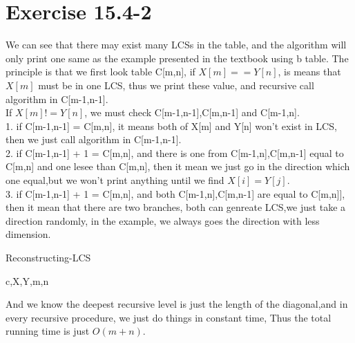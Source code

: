 \documentclass[oneside]{homework} %
\begin{document}
\maketitle
\newpage
\section{Exercise 15.4-2}
We can see that there may exist many LCSs in the table, and the algorithm will only print one same as the example presented in the textbook using b table.
The principle is that we first look table C[m,n], if $X[m] == Y[n]$, is means that $X[m]$ must be in one LCS, thus we print these value, and recursive call algorithm in C[m-1,n-1].\\
If $X[m] != Y[n] $, we must check C[m-1,n-1],C[m,n-1] and C[m-1,n].  \\
1. if C[m-1,n-1] = C[m,n], it means both of X[m] and Y[n] won't exist in LCS, then we just call algorithm in C[m-1,n-1]. 
\\ 2. if C[m-1,n-1] + 1 = C[m,n], and there is one from C[m-1,n],C[m,n-1] equal to C[m,n] and one lesee than C[m,n], then it mean we just go in the direction which one equal,but we won't print anything until we find $X[i] = Y[j]$. 
\\ 3. if C[m-1,n-1] + 1 = C[m,n], and both C[m-1,n],C[m,n-1] are equal to C[m,n]], then it mean that there are two branches, both can genreate LCS,we just take a direction randomly, in the example, we always goes the direction with less dimension. 

  \begin{algorithm}[h]
	\caption{Reconstructing-LCS}
	\label{algo:lcs}
	\begin{algorithmic}[1]
	  \REQUIRE c,X,Y,m,n
	  \ELSE
		  \ELSE
		  \ENDIF
		\ELSE
			\ELSE
			\ENDIF
		\ENDIF
	  \ENDIF
	  \LASTCON 
	\end{algorithmic}
  \end{algorithm}
  And we know the deepest recursive level is just the length of the diagonal,and in every recursive procedure, we just do things in constant time, Thus the total running time is just $O(m+n)$.
\end{document}

